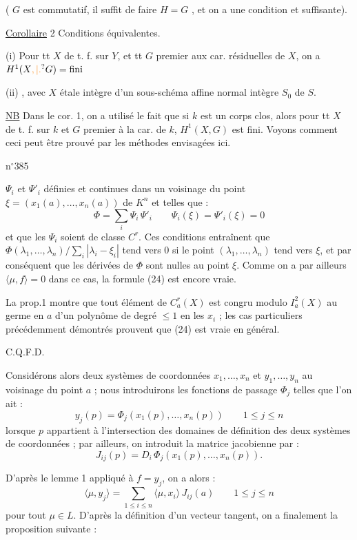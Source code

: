 ( $G$ est commutatif, il suffit de faire $H=G$ , et on a une condition  et suffisante).

\uline{Corollaire} 2 Conditions équivalentes.

(i) Pour tt $X$ de t. f. sur $Y$, et tt   $G$ premier aux car. résiduelles de $X$, on a $H^1(X\unsure{,|.}G)=\text{fini}$

(ii)  , avec $X$   étale intègre d'un sous-schéma affine normal intègre $S_0$ de $S$.

\uline{NB} Dans le cor. 1, on a utilisé le fait que si $k$ est un corps  clos, alors pour tt $X$ de t. f. sur $k$ et $G$ premier à la car. de $k$, $H^1(X,G)$ est fini. Voyons comment ceci peut être prouvé par les méthodes envisagées ici.

n$^{\circ}$385

$\Psi_i$ et $\Psi'_i$ définies et continues dans un voisinage du point $\xi=(x_1(a),\ldots,x_n(a))$ de $K^n$ et telles que :
\[
\Phi=\sum_i\Psi_i\,\Psi'_i\qquad\Psi_i(\xi)=\Psi'_i(\xi)=0
\]
et que les $\Psi_i$ soient de classe $C^r$. Ces conditions entraînent que $\Phi(\lambda_1,\ldots,\lambda_n)/\sum\limits_i|\lambda_i-\xi_i|$ tend vers $0$ si le point $(\lambda_1,\ldots,\lambda_n)$ tend vers $\xi$, et par conséquent que les dérivées de $\Phi$ sont nulles au point $\xi$. Comme on a par ailleurs $\langle\mu,f\rangle=0$ dans ce cas, la formule (24) est encore vraie.

La prop.1 montre que tout élément de $C_a^r(X)$ est congru modulo $I_a^2(X)$ au germe en $a$ d'un polynôme de degré $\leq 1$ en les $x_i$ ; les cas particuliers précédemment démontrés prouvent que (24) est vraie en général.

\hfill C.Q.F.D.

Considérons alors deux systèmes de coordonnées $x_1,\ldots,x_n$ et $y_1,\ldots,y_n$ au voisinage du point $a$ ; nous introduirons les fonctions de passage $\Phi_j$ telles que l'on ait :
\[
y_j(p)=\Phi_j(x_1(p),\ldots,x_n(p))\qquad 1\leq j\leq n\tag*{(26)}
\]
lorsque $p$ appartient à l'intersection des domaines de définition des deux systèmes de coordonnées ; par ailleurs, on introduit la matrice jacobienne par :
\[
J_{ij}(p)=D_i\,\Phi_j(x_1(p),\ldots,x_n(p)).
\]

D'après le lemme 1 appliqué à $f=y_j$, on a alors :
\[
\langle\mu,y_j\rangle=\sum_{1\leq i\leq n}\langle\mu,x_i\rangle\,J_{ij}(a)\qquad 1\leq j\leq n\tag*{(27)}
\]
pour tout $\mu\in L$. D'après la définition d'un vecteur tangent, on a finalement la proposition suivante :

